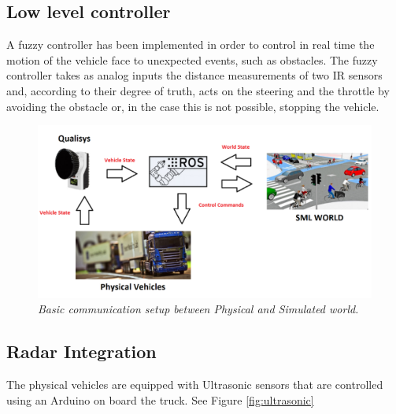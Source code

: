 \documentclass[11pt,a4paper]{book}
\begin{document}
\subsection{Low level controller} 
A fuzzy controller has been implemented in order to control in real time the motion of the vehicle face to unexpected events, such as obstacles. The fuzzy controller takes as analog inputs the distance measurements of two IR sensors and, according to their degree of truth, acts on the steering and the throttle by avoiding the obstacle or, in the case this is not possible, stopping the vehicle.

\begin{figure}[!ht]

  \centering
    \includegraphics[width=\textwidth]{physicalvehicles.png}
  \caption{\textit{Basic communication setup between Physical and Simulated world.}}
\label{fig:setup}
\end{figure}

\subsection{Radar Integration}
The physical vehicles are equipped with Ultrasonic sensors that are controlled using an Arduino on board the truck. See Figure \ref{fig:ultrasonic}
\end{document}
